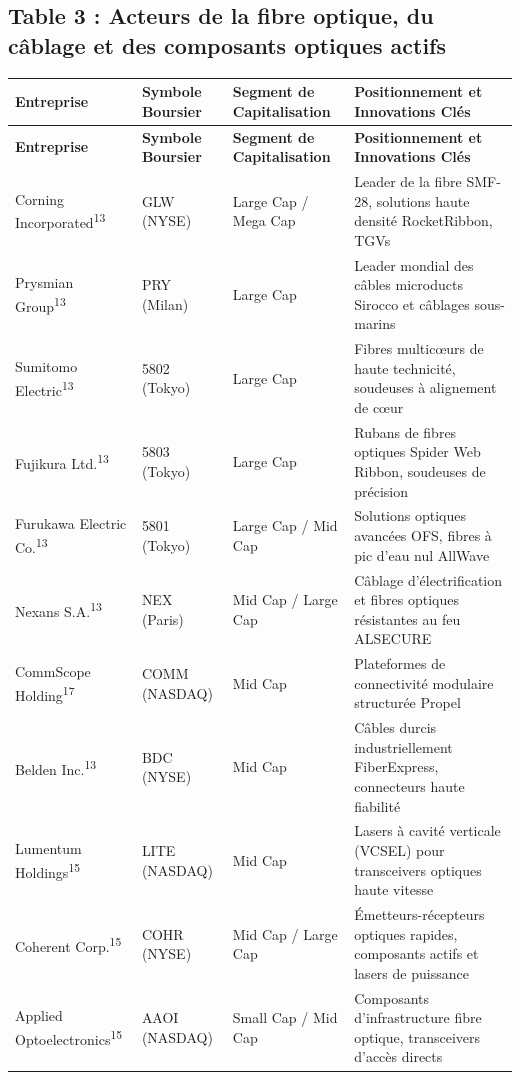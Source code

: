 \documentclass[11pt,a4paper]{article}
\begin{document}
\subsection*{Table 3 : Acteurs de la fibre optique, du câblage et des composants optiques actifs}
\begin{longtable}{p{3cm} p{3.5cm} p{3cm} p{5cm}}
\toprule
\textbf{Entreprise} & \textbf{Symbole Boursier} & \textbf{Segment de Capitalisation} & \textbf{Positionnement et Innovations Clés} \\
\midrule
\endfirsthead
\toprule
\textbf{Entreprise} & \textbf{Symbole Boursier} & \textbf{Segment de Capitalisation} & \textbf{Positionnement et Innovations Clés} \\
\midrule
\endhead
Corning Incorporated\textsuperscript{13} & GLW (NYSE) & Large Cap / Mega Cap & Leader de la fibre SMF-28, solutions haute densité RocketRibbon, TGVs \\
Prysmian Group\textsuperscript{13} & PRY (Milan) & Large Cap & Leader mondial des câbles microducts Sirocco et câblages sous-marins \\
Sumitomo Electric\textsuperscript{13} & 5802 (Tokyo) & Large Cap & Fibres multicœurs de haute technicité, soudeuses à alignement de cœur \\
Fujikura Ltd.\textsuperscript{13} & 5803 (Tokyo) & Large Cap & Rubans de fibres optiques Spider Web Ribbon, soudeuses de précision \\
Furukawa Electric Co.\textsuperscript{13} & 5801 (Tokyo) & Large Cap / Mid Cap & Solutions optiques avancées OFS, fibres à pic d'eau nul AllWave \\
Nexans S.A.\textsuperscript{13} & NEX (Paris) & Mid Cap / Large Cap & Câblage d'électrification et fibres optiques résistantes au feu ALSECURE \\
CommScope Holding\textsuperscript{17} & COMM (NASDAQ) & Mid Cap & Plateformes de connectivité modulaire structurée Propel \\
Belden Inc.\textsuperscript{13} & BDC (NYSE) & Mid Cap & Câbles durcis industriellement FiberExpress, connecteurs haute fiabilité \\
Lumentum Holdings\textsuperscript{15} & LITE (NASDAQ) & Mid Cap & Lasers à cavité verticale (VCSEL) pour transceivers optiques haute vitesse \\
Coherent Corp.\textsuperscript{15} & COHR (NYSE) & Mid Cap / Large Cap & Émetteurs-récepteurs optiques rapides, composants actifs et lasers de puissance \\
Applied Optoelectronics\textsuperscript{15} & AAOI (NASDAQ) & Small Cap / Mid Cap & Composants d'infrastructure fibre optique, transceivers d'accès directs \\

\end{longtable}
\end{document}
